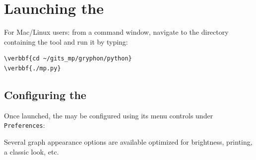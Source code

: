 \documentclass[11pt,fleqn]{article} %
\begin{document}
%

\section{Launching the \ggui}
For Mac/Linux users: from a command window, navigate to the directory containing the \ggui tool and run it by typing:
\begin{Verbatim}[commandchars=\\\{\}]
\verbbf{cd ~/gits_mp/gryphon/python}
\verbbf{./mp.py}
\end{Verbatim}

\subsection{Configuring the \ggui}
Once launched, the \ggui may be configured using its menu controls under \verb+Preferences+:
\begin{compactitem}
\item Several graph appearance options are available optimized for brightness, printing, a classic look, etc.\\
\end{compactitem}
\end{document}
